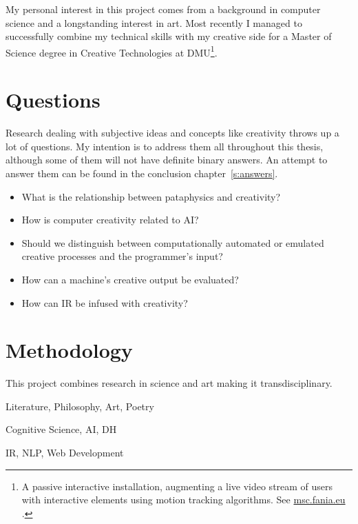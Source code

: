 \spirals

My personal interest in this project comes from a background in computer science and a longstanding interest in art. Most recently I managed to successfully combine my technical skills with my creative side for a Master of Science degree in Creative Technologies at \ac{DMU}\footnote{A passive interactive installation, augmenting a live video stream of users with interactive elements using motion tracking algorithms. See \url{msc.fania.eu} \autocite{Raczinski2010}.}. 


\section{Questions}

Research dealing with subjective ideas and concepts like creativity throws up a lot of questions. My intention is to address them all throughout this thesis, although some of them will not have definite binary answers. An attempt to answer them can be found in the conclusion chapter~\ref{s:answers}.

\begin{itemize}
  \item What is the relationship between pataphysics and creativity?
  \item How is computer creativity related to \ac{AI}?
  \item Should we distinguish between computationally automated or emulated creative processes and the programmer's input?
  \item How can a machine's creative output be evaluated?
  \item How can \ac{IR} be infused with creativity?
\end{itemize}


\section{Methodology}
\label{s:intromethod}

This project combines research in science and art making it transdisciplinary.

\begin{description}[leftmargin=3cm]
  \item [Pataphysics] Literature, Philosophy, Art, Poetry
  \item [Creativity] Cognitive Science, \ac{AI}, \ac{DH}
  \item [Technology] \ac{IR}, \ac{NLP}, Web Development
\end{description}


